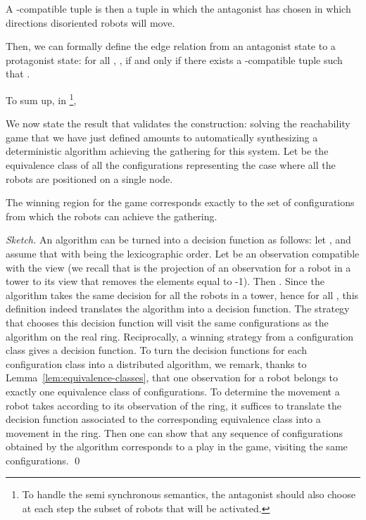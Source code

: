 \documentclass[envcountsame]{llncs} \usepackage[english]{babel}
\begin{document}
A -compatible tuple is then a tuple in which the antagonist has chosen in which directions disoriented robots 
will move.

Then, we can formally define the edge relation from an antagonist state to a protagonist state: for all , ,
 if and only if there exists a -compatible tuple  such that .

To sum up, in \footnote{To handle the semi synchronous semantics, the antagonist should also choose at each step the subset of robots
that will be activated.}, 






We now state the result that validates the construction: solving the reachability game that we have just defined
amounts to automatically synthesizing a deterministic algorithm achieving the gathering for this system.
Let  be the equivalence class of all the configurations representing the case where all the robots
are positioned on a single node.
\begin{theorem}\label{th:correctness}
The winning region for the game  corresponds exactly to the set of 
configurations from which the robots can achieve the gathering.
\end{theorem}

\begin{proof}[Sketch]
An algorithm  can be turned into a decision function  as follows: let , and assume that  with  being the lexicographic order. Let  be an observation compatible
with the view  (we recall that  is the projection of an observation for a robot in a tower to its view that removes the
elements equal to -1). Then . Since the algorithm  takes the same decision for all the robots in a 
tower, hence for all , this definition indeed translates the algorithm into a decision function. The strategy that chooses this decision 
function will visit the same configurations as the algorithm on the real ring. Reciprocally, a winning strategy from a configuration class gives a decision function. To 
turn the decision functions for each configuration class into a distributed algorithm, we remark, thanks to Lemma~\ref{lem:equivalence-classes}, that one 
observation for a robot belongs to exactly one equivalence class of configurations. To determine the movement a robot takes according to its observation of the 
ring, it suffices to translate the decision function associated to the corresponding equivalence class into a movement in the ring. Then one can show that any 
sequence of configurations obtained by the algorithm corresponds to a play in the game, visiting the same configurations.
\qed\end{proof}
\end{document}
